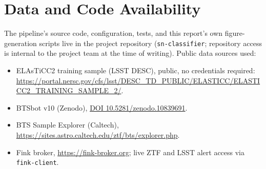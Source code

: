 \chapter*{Data and Code Availability}

The pipeline's source code, configuration, tests, and this report's own
figure-generation scripts live in the project repository (\texttt{sn-classifier};
repository access is internal to the project team at the time of writing).
Public data sources used:
\begin{itemize}\raggedright
  \item ELAsTiCC2 training sample (LSST DESC), public, no credentials
    required: \url{https://portal.nersc.gov/cfs/lsst/DESC_TD_PUBLIC/ELASTICC/ELASTICC2_TRAINING_SAMPLE_2/}.
  \item BTSbot v10 (Zenodo), \href{https://doi.org/10.5281/zenodo.10839691}{DOI 10.5281/zenodo.10839691}.
  \item BTS Sample Explorer (Caltech), \url{https://sites.astro.caltech.edu/ztf/bts/explorer.php}.
  \item Fink broker, \url{https://fink-broker.org}; live ZTF and LSST alert
    access via \texttt{fink-client}.
\end{itemize}
